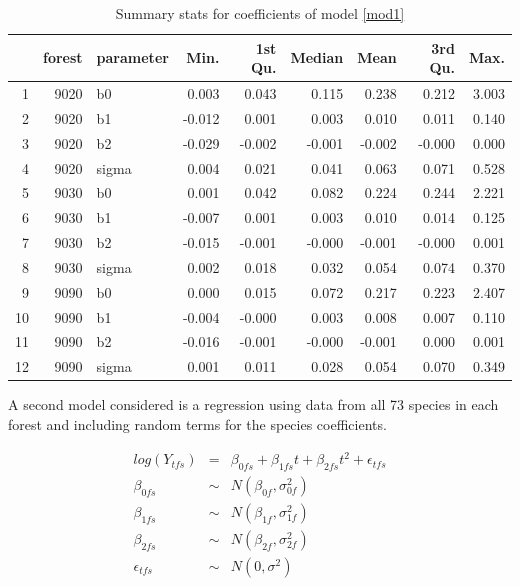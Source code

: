 \documentclass{article}\usepackage{graphicx, color}
\begin{document}
\begin{table}[hbpt] 
\caption{Summary stats for coefficients of model \ref{mod1} \label{tab1}}
\begin{center}
\begin{tabular}{rrlrrrrrr} 
  \hline
 & forest & parameter & Min. & 1st Qu. & Median & Mean & 3rd Qu. & Max. \\ 
  \hline
1 & 9020 & b0 & 0.003 & 0.043 & 0.115 & 0.238 & 0.212 & 3.003 \\ 
  2 & 9020 & b1 & -0.012 & 0.001 & 0.003 & 0.010 & 0.011 & 0.140 \\ 
  3 & 9020 & b2 & -0.029 & -0.002 & -0.001 & -0.002 & -0.000 & 0.000 \\ 
  4 & 9020 & sigma & 0.004 & 0.021 & 0.041 & 0.063 & 0.071 & 0.528 \\ \hline
  5 & 9030 & b0 & 0.001 & 0.042 & 0.082 & 0.224 & 0.244 & 2.221 \\ 
  6 & 9030 & b1 & -0.007 & 0.001 & 0.003 & 0.010 & 0.014 & 0.125 \\ 
  7 & 9030 & b2 & -0.015 & -0.001 & -0.000 & -0.001 & -0.000 & 0.001 \\ 
  8 & 9030 & sigma & 0.002 & 0.018 & 0.032 & 0.054 & 0.074 & 0.370 \\ \hline
  9 & 9090 & b0 & 0.000 & 0.015 & 0.072 & 0.217 & 0.223 & 2.407 \\ 
  10 & 9090 & b1 & -0.004 & -0.000 & 0.003 & 0.008 & 0.007 & 0.110 \\ 
  11 & 9090 & b2 & -0.016 & -0.001 & -0.000 & -0.001 & 0.000 & 0.001 \\ 
  12 & 9090 & sigma & 0.001 & 0.011 & 0.028 & 0.054 & 0.070 & 0.349 \\ 
   \hline
\end{tabular}
\end{center}
\end{table}

A second model considered is a regression using data from all 73 species in each forest and including random terms for the species coefficients. 

\begin{eqnarray}
\nonumber log(Y_{tfs}) &=&  \beta_{0fs} + \beta_{1fs}t + \beta_{2fs}t^2 + \epsilon_{tfs}  \\
\nonumber \beta_{0fs} &\sim& N(\beta_{0f}, \sigma_{0f}^2 ) \\ 
\nonumber \beta_{1fs} &\sim& N(\beta_{1f}, \sigma_{1f}^2 ) \\ 
\nonumber \beta_{2fs} &\sim& N(\beta_{2f}, \sigma_{2f}^2 ) \\ 
\epsilon_{tfs} &\sim& N(0,\sigma^2)
\label{mod2}
\end{eqnarray}
\end{document}
